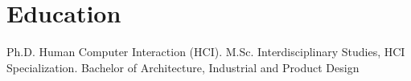 \documentclass[full]{rvca}
\begin{document}
\section{Education}

Ph.D. Human Computer Interaction (HCI).
M.Sc. Interdisciplinary Studies, HCI Specialization.
Bachelor of Architecture, Industrial and Product Design

\begin{riddle}
\ghost
\end{riddle}
\end{document}
